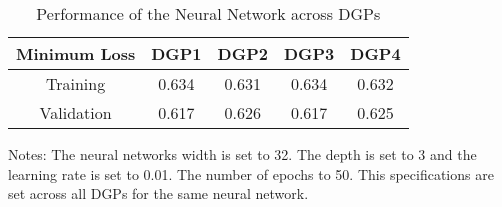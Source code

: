 

\begin{table}[ht]
\centering
\begin{threeparttable}
\caption{Performance of the Neural Network across DGPs}
\label{tab:table3}
\begin{tabular}{ccccc} %
\toprule
\hline
\addlinespace
Minimum Loss  & DGP1 & DGP2 & DGP3 & DGP4 \\ \midrule
Training   & 0.634 & 0.631 & 0.634 & 0.632 \\
Validation  & 0.617 & 0.626 & 0.617 & 0.625 \\ \bottomrule
\end{tabular}
\begin{tablenotes}
    \item Notes: The neural networks width is set to 32. The depth is set to 3 and the learning rate is set to 0.01. The number of epochs to 50. This specifications are set across all DGPs for the same neural network.
\end{tablenotes}
\end{threeparttable}
\end{table}
